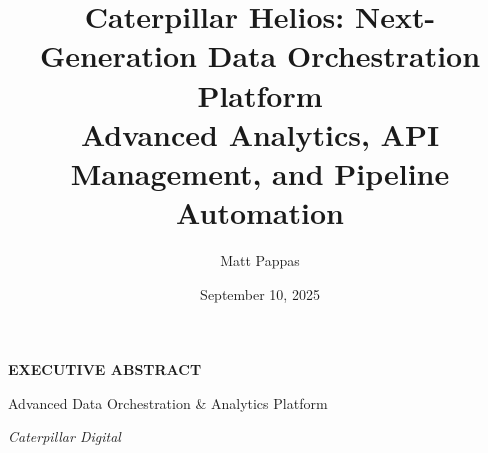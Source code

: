 \documentclass[12pt, a4paper]{article} %
\title{Caterpillar Helios: Next-Generation Data Orchestration Platform\\Advanced Analytics, API Management, and Pipeline Automation}
\author{Matt Pappas}
\date{September 10, 2025}
\begin{document}
\begin{center}

    \vspace{0.5em}

    {\LARGE \bfseries \MakeUppercase{Executive Abstract} \par}

    \vspace{0.25em}

    {\small Advanced Data Orchestration \& Analytics Platform}

    \vspace{0.25em}

    {\small \emph{Caterpillar Digital}}

    \vspace{0.5em}
    
\end{center}
\end{document}
